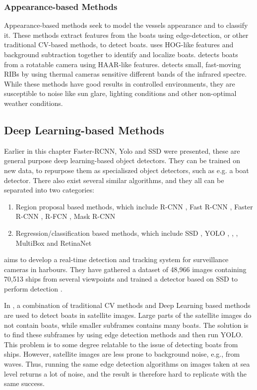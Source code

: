 \subsubsection{Appearance-based Methods}
Appearance-based methods seek to model the vessels appearance and to classify it. These methods extract features from the boats using edge-detection, or other traditional CV-based methods, to detect boats. \citep{HOGdetection} uses HOG-like features and background subtraction together to identify and localize boats. \citep{HAARdetection} detects boats from a rotatable camera using HAAR-like features. \citep{RIBDetection} detects small, fast-moving RIBs by using thermal cameras sensitive different bands of the infrared spectre. While these methods have good results in controlled environments, they are susceptible to noise like sun glare, lighting conditions and other non-optimal weather conditions. 


\subsection{Deep Learning-based Methods}
Earlier in this chapter Faster-RCNN, Yolo and SSD were presented, these are general purpose deep learning-based object detectors. They can be trained on new data, to repurpose them as specialiszed object detectors, such as e.g. a boat detector. There also exist several similar algorithms, and they all can be separated into two categories:

\begin{enumerate}
\item Region proposal based methods, which include R-CNN \citep{R-CNN}, Fast R-CNN \citep{FastR-CNN}, Faster R-CNN \citep{FasterR-CNN}, R-FCN \citep{R-FCN}, Mask R-CNN \citep{MaskRCNN}
\item Regression/classification based methods, which include SSD \citep{SSD}, YOLO \citep{YOLOv1}, \citep{YOLOv2}, \citep{YOLOv3}, MultiBox \citep{Multibox} and RetinaNet \citep{Retinanet}
\end{enumerate}


\citep{SSD_detection2018} aims to develop a real-time detection and tracking system for surveillance cameras in harbours. They have gathered a dataset of 48,966 images containing 70,513 ships from several viewpoints and trained a detector based on SSD to perform detection \citep{SSD}. 

\vspace{3mm}

In \citep{VanEtten2018}, a combination of traditional CV methods and Deep Learning based methods are used to detect boats in satellite images. Large parts of the satellite images do not contain boats, while smaller subframes contains many boats. The solution is to find these subframes by using edge detection methods and then run YOLO. This problem is to some degree relatable to the issue of detecting boats from ships. However, satellite images are less prone to background noise, e.g., from waves. Thus, running the same edge detection algorithms on images taken at sea level returns a lot of noise, and the result is therefore hard to replicate with the same success.

